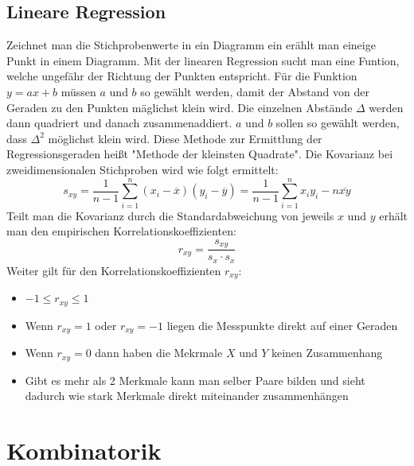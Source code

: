 \documentclass[a4paper]{scrartcl}
\begin{document}
            \subsection{Lineare Regression}
                Zeichnet man die Stichprobenwerte in ein Diagramm ein erählt man eineige Punkt in einem Diagramm. Mit der linearen Regression sucht man eine Funtion, welche ungefähr
                der Richtung der Punkten entspricht. Für die Funktion \(y = ax + b\) müssen \(a\) und \(b\) so gewählt werden, damit der Abstand von der Geraden zu den Punkten mäglichst klein wird.
                Die einzelnen Abstände \(\Delta \) werden dann quadriert und danach zusammenaddiert. \(a\) und \(b\) sollen so gewählt werden, dass \(\Delta ^2\) möglichst klein wird.
                Diese Methode zur Ermittlung der Regressionsgeraden heißt "Methode der kleinsten Quadrate". Die Kovarianz bei zweidimensionalen Stichproben wird wie folgt ermittelt:
                \begin{equation*}
                   s_{xy}= \frac{1}{n - 1} \sum_{i=1}^n (x_i - \overline{x})(y_i - \overline{y}) = \frac{1}{n - 1}\sum_{i=1}^n x_i y_i - n \overline{xy}
                \end{equation*}
                Teilt man die Kovarianz durch die Standardabweichung von jeweils \(x\) und \(y\) erhält man den empirischen Korrelationskoeffizienten:
                \begin{equation*}
                    r_{xy} = \frac{s_{xy}}{s_x \cdot s_x}
                \end{equation*}
                Weiter gilt für den Korrelationskoeffizienten \(r_{xy}\): 
                \begin{itemize}
                    \item \(-1 \leq r_{xy} \leq 1\)
                    \item Wenn \(r_{xy} = 1\) oder \(r_{xy} = -1\) liegen die Messpunkte direkt auf einer Geraden
                    \item Wenn \(r_{xy} = 0\) dann haben die Mekrmale \(X\) und \(Y\) keinen Zusammenhang
                    \item Gibt es mehr als 2 Merkmale kann man selber Paare bilden und sieht dadurch wie stark Merkmale direkt miteinander zusammenhängen 
                \end{itemize} 

    \section{Kombinatorik}
\end{document}
